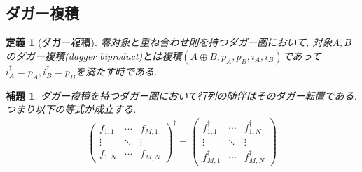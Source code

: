 \documentclass[a4paper,12pt]{ltjsarticle}
\theoremstyle{break}
\newtheorem{defn}[thm]{定義}
\newtheorem{lem}[thm]{補題}
\newcommand{\da}{\dagger}
\newcommand{\opl}{\oplus}
\numberwithin{equation}{section}
\begin{document}
\subsection{ダガー複積}

\begin{defn}[ダガー複積]
  零対象と重ね合わせ則を持つダガー圏において, 対象$A,B$のダガー複積(dagger biproduct)とは複積$(A \opl B,p_A,p_B,i_A,i_B)$であって$i_A^\da=p_A, i_B^\da=p_B$を満たす時である. 
\end{defn}

\begin{lem}
  ダガー複積を持つダガー圏において行列の随伴はそのダガー転置である. 
  つまり以下の等式が成立する. 
  \begin{align*} 
      \begin{pmatrix}
      f_{1,1} & \cdots & f_{M,1} \\
      \vdots & \ddots & \vdots \\
      f_{1,N} & \cdots  & f_{M,N}
      \end{pmatrix}^\da
    = 
    \begin{pmatrix}
      f_{1,1}^\da & \cdots & f_{1,N}^\da \\
      \vdots & \ddots & \vdots \\
      f_{M,1}^\da & \cdots  & f_{M,N}^\da
    \end{pmatrix}
  \end{align*}
\end{lem}
\end{document}
